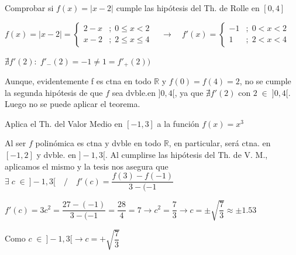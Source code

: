 	
	
	
	\begin{ejre} Comprobar si $f(x)=|x-2|$ cumple las hipótesis del Th. de Rolle en $[0,4]$
		
	\end{ejre}
	
	\begin{proofw}\renewcommand{\qedsymbol}{$\diamond$}	
	
	$f(x)=|x-2|=\begin{cases}
	2-x &; \;  0\le x<2 \\
	x-2 &; \;   2 \le x \le 4
	\end{cases} \quad \to \quad f'(x)=\begin{cases}
	-1 &; \;   0<x<2 \\
	1 &; \;   2<x<4 
	\end{cases}$
	
	$\nexists f'(2): \; f'_-(2)=-1\neq 1 =f'_+(2))$
	
	Aunque, evidentemente f es ctna en todo $\mathbb R$ y $f(0)=f(4)=2$, no se cumple la segunda hipótesis de que $f$ sea dvble.en $]0,4[$, ya que $\nexists f'(2)$ con $2\; \in \; ]0,4[$. Luego no se puede aplicar el teorema.
	\end{proofw}
	
	
	\begin{ejre} Aplica el Th. del Valor Medio en $[-1,3]$ a la función $f(x)=x^3$
		
	\end{ejre}
	\begin{proofw}\renewcommand{\qedsymbol}{$\diamond$}	
	
	Al ser $f$ polinómica es ctna y dvble en todo $\mathbb R$, en particular, será ctna. en $[-1,2]$ y dvble. en $]-1,3[$. Al cumplirse las hipótesis del Th. de V. M., aplicamos el mismo y la tesis nos asegura que $\exists \; c\;\in\ ]-1,3[ \quad / \quad f'(c)=\dfrac {f(3)-f(-1)}{3-(-1}$
	
	$f'(c)=3c^2=\dfrac {27-(-1)}{3-(-1}=\dfrac {28}{4}= 7 \to c^2= \dfrac 7 3 \to c= \pm \sqrt{\dfrac 7 3} \approx \pm 1.53$
	
	Como $ c\;\in\ ]-1,3[ \to c=+\sqrt{\dfrac 7 3}$

		
	\end{proofw}
	

